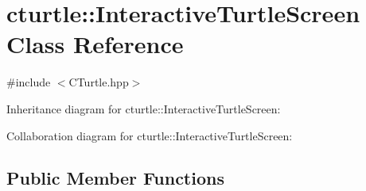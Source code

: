 \hypertarget{classcturtle_1_1InteractiveTurtleScreen}{}\section{cturtle\+:\+:Interactive\+Turtle\+Screen Class Reference}
\label{classcturtle_1_1InteractiveTurtleScreen}


{\ttfamily \#include $<$C\+Turtle.\+hpp$>$}



Inheritance diagram for cturtle\+:\+:Interactive\+Turtle\+Screen\+:


Collaboration diagram for cturtle\+:\+:Interactive\+Turtle\+Screen\+:
\subsection*{Public Member Functions}
